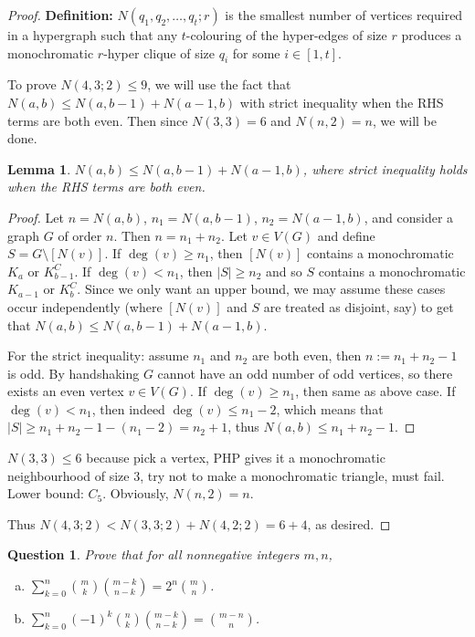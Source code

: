 \documentclass[12]{article}
\newtheorem{lem}{Lemma} %
\newtheorem{question}{Question}
\theoremstyle{definition}
\begin{document}
	\begin{proof}
		\textbf{Definition:} $N(q_1, q_2, \ldots, q_t;r)$ is the smallest number of vertices required in a hypergraph such that any $t$-colouring of the hyper-edges of size $r$ produces a monochromatic $r$-hyper clique of size $q_i$ for some $i \in [1,t]$.
		
		To prove $N(4,3;2) \leq 9$, we will use the fact that $N(a,b) \leq N(a,b-1) + N(a-1,b)$ with strict inequality when the RHS terms are both even.  Then since $N(3,3) = 6$ and $N(n,2) = n$, we will be done.
		
		\begin{lem}
			$N(a,b) \leq N(a,b-1) + N(a-1,b)$, where strict inequality holds when the RHS terms are both even.
		\end{lem}
		\begin{proof}
			Let $n = N(a,b)$, $n_1 = N(a,b-1)$, $n_2 = N(a-1,b)$, and consider a graph $G$ of order $n$.  Then $n = n_1 + n_2$.  Let $v \in V(G)$ and define $S = G \setminus [N(v)]$.  If $\deg(v) \geq n_1$, then $[N(v)]$ contains a monochromatic $K_{a}$ or $K_{b-1}^C$.  If $\deg(v) < n_1$, then $|S| \geq n_2$ and so $S$ contains a monochromatic $K_{a-1}$ or $K_{b}^C$.  Since we only want an upper bound, we may assume these cases occur independently (where $[N(v)]$ and $S$ are treated as disjoint, say) to get that $N(a,b) \leq N(a,b-1) + N(a-1,b)$.
			
			For the strict inequality: assume $n_1$ and $n_2$ are both even, then $n := n_1 + n_2 -1$ is odd.  By handshaking $G$ cannot have an odd number of odd vertices, so there exists an even vertex $v \in V(G)$.  If $\deg(v) \geq n_1$, then same as above case.  If $\deg(v) < n_1$, then indeed $\deg(v) \leq n_1 -2$, which means that $|S| \geq n_1 + n_2 -1 - (n_1-2) = n_2 + 1$, thus $N(a,b) \leq n_1 + n_2 - 1$.
		\end{proof}
		$N(3,3) \leq 6$ because pick a vertex, PHP gives it a monochromatic neighbourhood of size $3$, try not to make a monochromatic triangle, must fail.  Lower bound: $C_5$.  Obviously, $N(n,2) = n$.
		
		Thus $N(4,3;2) < N(3,3;2) + N(4,2;2) = 6 + 4$, as desired.
	\end{proof}

	\begin{question}
		Prove that for all nonnegative integers $m, n$,
		\begin{enumerate}[a)]
			\item $\sum_{k=0}^n  {m \choose k}{m-k \choose n-k} = 2^n{m \choose n}$.
			
			\item $\sum_{k=0}^n (-1)^k {n \choose k} {m-k \choose n-k} = {m - n \choose n}$.
		\end{enumerate}

	\end{question}
\end{document}
